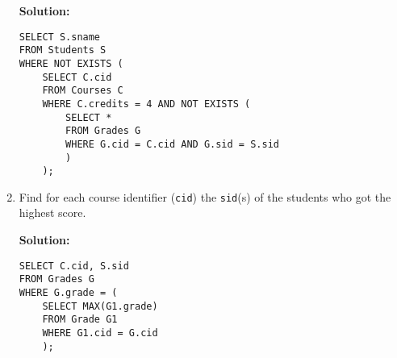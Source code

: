 \begin{enumerate}[label=(\alph*)]
\textbf{Solution:}

\begin{lstlisting}
SELECT S.sname
FROM Students S
WHERE NOT EXISTS (
	SELECT C.cid
	FROM Courses C
	WHERE C.credits = 4 AND NOT EXISTS (
		SELECT *
		FROM Grades G
		WHERE G.cid = C.cid AND G.sid = S.sid
		)
	);
\end{lstlisting}

\item Find for each course identifier (\texttt{cid}) the \texttt{sid}(s) of the students who got the highest score.

\textbf{Solution:}

\begin{lstlisting}
SELECT C.cid, S.sid
FROM Grades G
WHERE G.grade = (
	SELECT MAX(G1.grade)
	FROM Grade G1
	WHERE G1.cid = G.cid
	);
\end{lstlisting}

\end{enumerate}
